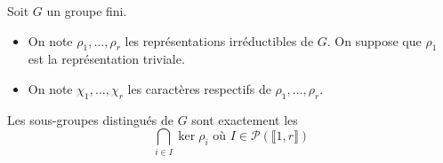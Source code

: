 





	Soit $G$ un groupe fini.

	\begin{notation}
		\begin{itemize}
			\item On note $\rho_1, \dots, \rho_r$ les représentations irréductibles de $G$. On suppose que $\rho_1$ est la représentation triviale.
			\item On note $\chi_1, \dots, \chi_r$ les caractères respectifs de $\rho_1, \dots, \rho_r$.
		\end{itemize}
	\end{notation}

	\begin{theorem}
		\label{sous-groupes-distingues-et-table-des-caracteres-1}
		Les sous-groupes distingués de $G$ sont exactement les
		\[ \bigcap_{i \in I} \ker{\rho_i} \text{ où } I \in \mathcal{P}(\llbracket 1, r \rrbracket) \]
	\end{theorem}

